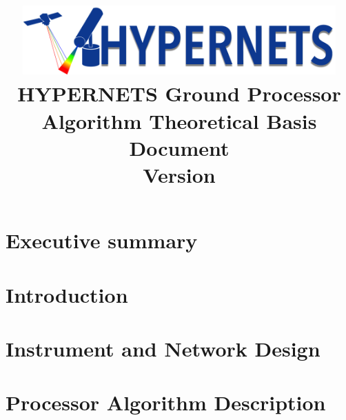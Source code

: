 \documentclass{article}
\begin{document}
\title{\includegraphics[width=12cm]{LOGOHYPERNETS_BGNRV3.png}\\
\textbf{HYPERNETS Ground Processor\\
Algorithm Theoretical Basis Document\\
Version \vhCurrentVersion}}
\maketitle
\thispagestyle{fancy}
\pagebreak

\begin{versionhistory}
\renewcommand \vhAuthorColWidth{5cm}
\renewcommand \vhChangeColWidth{5cm}
\end{versionhistory}
\pagebreak
 
\section*{Executive summary}
%
\pagebreak

\pagebreak

\tableofcontents
\pagebreak


\pagebreak

\section{Introduction}\label{sec-intro}

\pagebreak

\section{Instrument and Network Design}\label{sec-instr}

\pagebreak

\section{Processor Algorithm Description}\label{sec-algo}

\pagebreak
\end{document}
